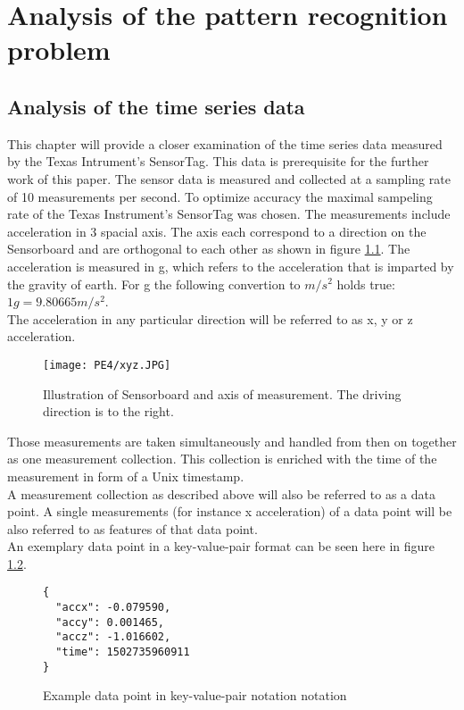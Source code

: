 \chapter{Analysis of the pattern recognition problem}
\label{ch:Analysis of the pattern recognition problem}

\section{Analysis of the time series data}
\label{sec:Analysis of the time series data}
This chapter will provide a closer examination of the time series data measured by the Texas Intrument's SensorTag. This data is prerequisite for the further work of this paper. \newline
The sensor data is measured and collected at a sampling rate of 10 measurements per second. To optimize accuracy the maximal sampeling rate of the Texas Instrument's SensorTag was chosen.  The measurements include acceleration in 3 spacial axis. The axis each correspond to a direction on the Sensorboard and are orthogonal to each other as shown in figure \ref{fig:xyzboard}. The acceleration is measured in g, which refers to the acceleration that is imparted by the gravity of earth. For g the following convertion to  $m/s^2 $ holds true: $ 1 g = 9.80665 m/s^2 $. 
\\
The acceleration in any particular direction will be referred to as x, y or z acceleration.

\begin{figure}[h]
\centering
\texttt{[image: PE4/xyz.JPG]}
\caption{Illustration of Sensorboard and axis of measurement. The driving direction is to the right.}
\label{fig:xyzboard}
\end{figure}


Those measurements are taken  simultaneously and handled from then on together as one measurement collection. This collection is enriched with the time of the measurement  in form of a Unix timestamp.\\
A measurement collection as described above will also be referred to as a data point. A single measurements (for instance x acceleration) of a data point will be also referred to as features of that data point.\\
An exemplary data point in a key-value-pair format can be seen here in figure \ref{fig:datapointjson}.

\begin{figure}[h]
\centering
\begin{lstlisting}
{
  "accx": -0.079590,
  "accy": 0.001465,
  "accz": -1.016602,
  "time": 1502735960911
}
\end{lstlisting}
\caption{Example data point in key-value-pair notation notation}
\label{fig:datapointjson}
\end{figure}

